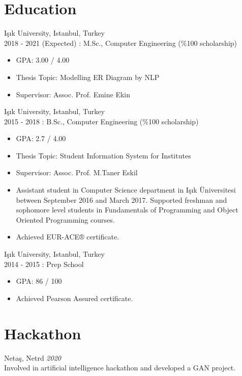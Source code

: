 \documentclass[margin, 10pt]{res} %
\begin{document}
\begin{resume}
\section{Education}

{\sl } Işık University, Istanbul, Turkey \\
2018 - 2021 (Expected) :  M.Sc., Computer Engineering (\%100 scholarship) 
\begin{itemize}
\item GPA: 3.00 / 4.00 
\item Thesis Topic:  Modelling ER Diagram by NLP 
\item Supervisor:  Assoc. Prof. Emine Ekin 
\end{itemize}

{\sl } Işık University, Istanbul, Turkey \\
2015 - 2018 :  B.Sc., Computer Engineering (\%100 scholarship) 
\begin{itemize}
\item GPA: 2.7 / 4.00  
\item Thesis Topic:  Student Information System for Institutes  
\item Supervisor:  Assoc. Prof. M.Taner Eskil 
\item Assistant student in Computer Science department in Işık Üniversitesi between September 2016 and March 2017. Supported freshman and sophomore level students in Fundamentals of Programming and Object Oriented Programming courses. 
\item Achieved EUR-ACE® certificate.
\end{itemize}

{\sl } Işık University, Istanbul, Turkey \\
2014 - 2015 :  Prep School  
\begin{itemize}
\item GPA: 86 / 100 
\item Achieved Pearson Assured  certificate.
\end{itemize}


\section{Hackathon}

Netaş, Netrd \hfill \textit{2020} \\
Involved in artificial intelligence hackathon and developed a GAN project.


\end{resume}
\end{document}
